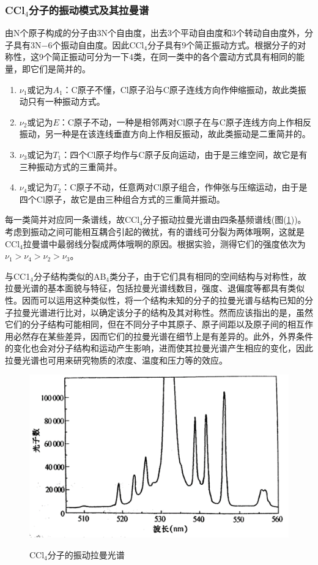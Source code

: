 \documentclass[a4paper]{article}
\begin{document}
\subsubsection{CCl$_4$分子的振动模式及其拉曼谱}
由N个原子构成的分子由3N个自由度，出去3个平动自由度和3个转动自由度外，分子具有3N$-$6个振动自由度。因此CCl$_4$分子具有9个简正振动方式。根据分子的对称性，这9个简正振动可分为一下4类，在同一类中的各个震动方式具有相同的能量，即它们是简并的。
\begin{enumerate}
\item $\nu_1$或记为$A_1$：C原子不懂，Cl原子沿与C原子连线方向作伸缩振动，故此类振动只有一种振动方式。
\item $\nu_2$或记为$E$：C原子不动，一种是相邻两对Cl原子在与C原子连线方向上作相反振动，另一种是在该连线垂直方向上作相反振动，故此类振动是二重简并的。
\item $\nu_3$或记为$T_1$：四个Cl原子均作与C原子反向运动，由于是三维空间，故它是有三种振动方式的三重简并。
\item $\nu_4$或记为$T_2$：C原子不动，任意两对Cl原子组合，作伸张与压缩运动，由于是四个Cl原子，故它是由三种组合方式的三重简并振动。
\end{enumerate}
每一类简并对应同一条谱线，故CCl$_4$分子振动拉曼光谱由四条基频谱线(图(\ref{fig4}))。考虑到振动之间可能相互耦合引起的微扰，有的谱线可分裂为两体哦啊，这就是CCl$_4$拉曼谱中最弱线分裂成两体哦啊的原因。根据实验，测得它们的强度依次为$\nu_1>\nu_4>\nu_2>\nu_3$。

与CC1$_4$分子结构类似的AB$_4$类分子，由于它们具有相同的空间结构与对称性，故拉曼光谱的基本面貌与特征，包括拉曼光谱线数目，强度、退偏度等都具有类似性。因而可以运用这种类似性，将一个结构未知的分子的拉曼光谱与结构已知的分子拉曼光谱进行比对，以确定该分子的结构及其对称性。然而应该指出的是，虽然它们的分子结构可能相同，但在不同分子中其原子、原子间距以及原子间的相互作用必然存在某些差异，因而它们的拉曼光谱在细节上是有差异的。此外，外界条件的变化也会对分子结构和运动产生影响，进而使其拉曼光谱产生相应的变化，因此拉曼光谱也可用来研究物质的浓度、温度和压力等的效应。
\begin{figure}[!h]
\centering
\includegraphics[width=12cm]{fig/4.png}\\
\caption{CCl$_4$分子的振动拉曼光谱}\label{fig4}
\end{figure}
\end{document}
